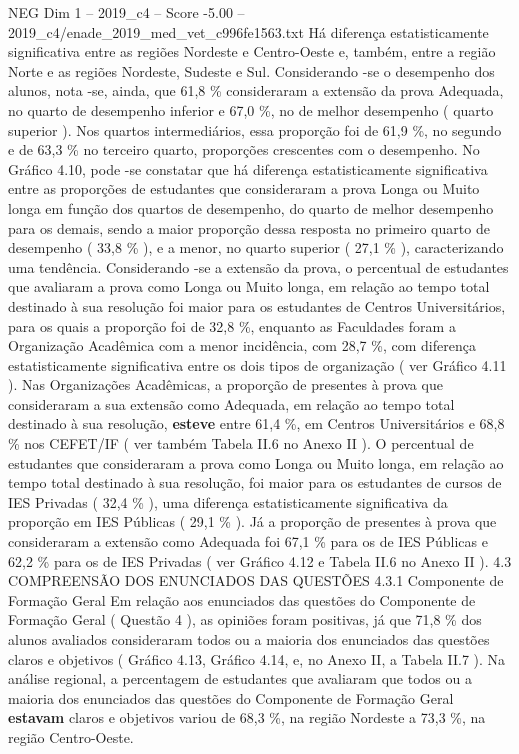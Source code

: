 \begin{textsample}{NEG Dim 1 – 2019\_c4 – Score -5.00 – 2019\_c4/enade\_2019\_med\_vet\_c996fe1563.txt}
Há diferença estatisticamente significativa entre as regiões Nordeste e Centro-Oeste e, também, entre a região Norte e as regiões Nordeste, Sudeste e Sul.
Considerando -se o desempenho dos alunos, nota -se, ainda, que 61,8 \% consideraram a extensão da prova Adequada, no quarto de desempenho inferior e 67,0 \%, no de melhor desempenho ( quarto superior ).
Nos quartos intermediários, essa proporção foi de 61,9 \%, no segundo e de 63,3 \% no terceiro quarto, proporções crescentes com o desempenho.
No Gráfico 4.10, pode -se constatar que há diferença estatisticamente significativa entre as proporções de estudantes que consideraram a prova Longa ou Muito longa em função dos quartos de desempenho, do quarto de melhor desempenho para os demais, sendo a maior proporção dessa resposta no primeiro quarto de desempenho ( 33,8 \% ), e a menor, no quarto superior ( 27,1 \% ), caracterizando uma tendência.
Considerando -se a extensão da prova, o percentual de estudantes que avaliaram a prova como Longa ou Muito longa, em relação ao tempo total destinado à sua resolução foi maior para os estudantes de Centros Universitários, para os quais a proporção foi de 32,8 \%, enquanto as Faculdades foram a Organização Acadêmica com a menor incidência, com 28,7 \%, com diferença estatisticamente significativa entre os dois tipos de organização ( ver Gráfico 4.11 ).
Nas Organizações Acadêmicas, a proporção de presentes à prova que consideraram a sua extensão como Adequada, em relação ao tempo total destinado à sua resolução, \textbf{esteve} entre 61,4 \%, em Centros Universitários e 68,8 \% nos CEFET/IF ( ver também Tabela II.6 no Anexo II ).
O percentual de estudantes que consideraram a prova como Longa ou Muito longa, em relação ao tempo total destinado à sua resolução, foi maior para os estudantes de cursos de IES Privadas ( 32,4 \% ), uma diferença estatisticamente significativa da proporção em IES Públicas ( 29,1 \% ).
Já a proporção de presentes à prova que consideraram a extensão como Adequada foi 67,1 \% para os de IES Públicas e 62,2 \% para os de IES Privadas ( ver Gráfico 4.12 e Tabela II.6 no Anexo II ). 4.3 COMPREENSÃO DOS ENUNCIADOS DAS QUESTÕES 4.3.1 Componente de Formação Geral Em relação aos enunciados das questões do Componente de Formação Geral ( Questão 4 ), as opiniões foram positivas, já que 71,8 \% dos alunos avaliados consideraram todos ou a maioria dos enunciados das questões claros e objetivos ( Gráfico 4.13, Gráfico 4.14, e, no Anexo II, a Tabela II.7 ).
Na análise regional, a percentagem de estudantes que avaliaram que todos ou a maioria dos enunciados das questões do Componente de Formação Geral \textbf{estavam} claros e objetivos variou de 68,3 \%, na região Nordeste a 73,3 \%, na região Centro-Oeste.

\end{textsample}

